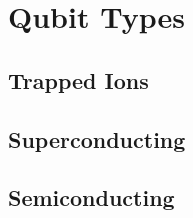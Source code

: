 \section{Qubit Types}\label{SEC:qubit_types}

\subsection{Trapped Ions}
\subsection{Superconducting}
\subsection{Semiconducting}